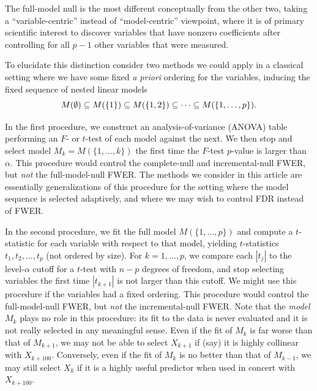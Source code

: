 \documentclass{article}
\begin{document}
The full-model null is the most different conceptually from the other two, taking a ``variable-centric'' instead of ``model-centric'' viewpoint, where it is of primary scientific interest to discover variables that have nonzero coefficients after controlling for all $p-1$ other variables that were measured.

To elucidate this distinction consider two methods we could apply in a classical setting where we have some fixed {\em a priori} ordering for the variables, inducing the fixed sequence of nested linear models
\[
M(\emptyset) \subseteq M(\{1\}) \subseteq M(\{1,2\}) \subseteq \cdots \subseteq M(\{1,\ldots, p\}).
\]

In the first procedure, we construct an analysis-of-variance (ANOVA) table performing an $F$- or $t$-test of each model against the next. We then stop and select model $M_k=M(\{1,\ldots,k\})$ the first time the $F$-test $p$-value is larger than $\alpha$. This procedure would control the complete-null and incremental-null FWER, but {\em not} the full-model-null FWER. The methods we consider in this article are essentially generalizations of this procedure for the setting where the model sequence is selected adaptively, and where we may wish to control FDR instead of FWER.


In the second procedure, we fit the full model $M(\{1,\ldots,p\})$ and compute a $t$-statistic for each variable with respect to that model, yielding $t$-statistics $t_1, t_2, \ldots, t_p$ (not ordered by size). For $k=1,\ldots,p$, we compare each $|t_j|$ to the level-$\alpha$ cutoff for a $t$-test with $n-p$ degrees of freedom, and stop selecting variables the first time $|t_{k+1}|$ is not larger than this cutoff. We might use this procedure if the variables had a  fixed ordering.
This procedure would control the full-model-null FWER, but {\em not} the incremental-null FWER. Note that the {\em model} $M_k$ plays no role in this procedure: its fit to the data is never evaluated and it is not really selected in any meaningful sense. Even if the fit of $M_k$ is far worse than that of $M_{k+1}$, we may not be able to select $X_{k+1}$ if (say) it is highly collinear with $X_{k+100}$. Conversely, even if the fit of $M_k$ is no better than that of $M_{k-1}$, we may still select $X_k$ if it is a highly useful predictor when used in concert with $X_{k+100}$.
\end{document}
